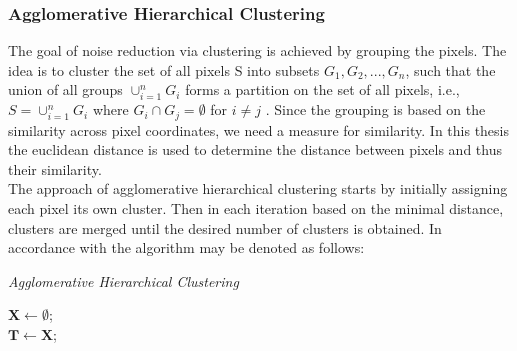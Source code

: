 \documentclass[aodsor,preprint]{imsart}
\numberwithin{equation}{section}
\theoremstyle{plain}
\begin{document}
\subsubsection{Agglomerative Hierarchical Clustering}
The goal of noise reduction via clustering is achieved by grouping the pixels. The idea is to cluster the set of all pixels S into subsets $G_1, G_2,..., G_n$, such that the union of all groups $\cup_{i = 1}^n G_i$ forms a partition on the set of all pixels, i.e., $S = \cup_{i = 1}^n G_i$ where $G_i \cap G_j = \emptyset$ for $i \neq j$ \citep{Rok09}. Since the grouping is based on the similarity across pixel coordinates, we need a measure for similarity. In this thesis the euclidean distance is used to determine the distance between pixels and thus their similarity.\\
The approach of agglomerative hierarchical clustering starts by initially assigning each pixel its own cluster. Then in each iteration based on the minimal distance, clusters are merged until the desired number of clusters is obtained. In accordance with \citet{RPA2018} the algorithm may be denoted as follows:


{}
\begin{algorithm}[hbt!]
	\caption{\textit{Agglomerative Hierarchical Clustering}}\label{alg:one}
	$\mathbf{X} \gets \emptyset$;\\
	$\mathbf{T} \gets \mathbf{X}$;\\
\end{algorithm}
\end{document}
